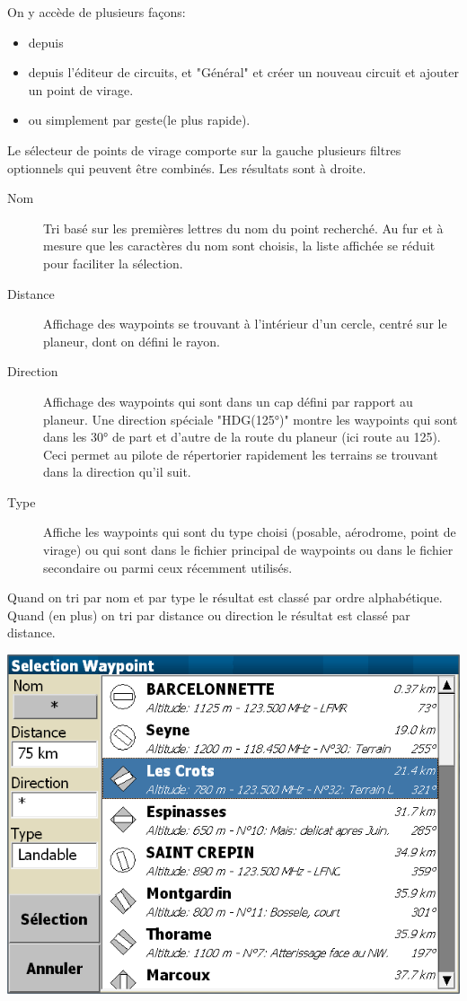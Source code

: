 On y accède de plusieurs façons:
\begin{itemize}
\item depuis  \blink{}
\item depuis l'éditeur de circuits,  \blink{} et "Général" et créer un nouveau circuit et ajouter un point de virage.
\item ou simplement par geste(le plus rapide).
\end{itemize}

Le sélecteur de points de virage comporte sur la gauche plusieurs filtres optionnels qui peuvent être combinés. Les résultats sont à droite.
\begin{description}
\item[Nom] Tri basé sur les premières lettres du nom du point recherché. Au fur et à mesure que les caractères du nom sont choisis, la liste affichée se réduit pour faciliter la sélection.\\
\item[Distance] Affichage des waypoints se trouvant à l'intérieur d'un cercle, centré sur le planeur, dont on défini le rayon.\\
\item[Direction] Affichage des waypoints qui sont dans un cap défini par rapport au planeur.
 Une direction spéciale "HDG(125°)" montre les waypoints qui sont dans les 30° de part et d'autre de la route du planeur (ici route au 125). Ceci permet au pilote de répertorier rapidement les terrains se trouvant dans la direction qu'il suit.\\
\item[Type] Affiche les waypoints qui sont du type choisi (posable, aérodrome, point de virage) ou qui sont dans le fichier principal de waypoints ou dans le fichier secondaire ou parmi ceux récemment utilisés.\\
\end{description}
Quand on tri par nom et par type le résultat est classé par ordre alphabétique. Quand (en plus) on tri par distance ou direction le résultat est classé par distance.

\begin{center}
\includegraphics[angle=0,width=0.8\linewidth,keepaspectratio='true']{figures/dialog-waypointselect.png}
\end{center}

